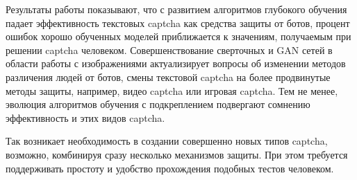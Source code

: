 Результаты работы показывают, что с развитием алгоритмов глубокого обучения падает эффективность текстовых captcha как средства защиты от ботов, процент ошибок хорошо обученных моделей приближается к значениям, получаемым при решении captcha человеком. Совершенствование сверточных и GAN сетей в области работы с изображениями актуализирует вопросы об изменении методов различения людей от ботов, смены текстовой captcha на более продвинутые методы защиты, например, видео captcha\cite{video-captcha} или игровая captcha\cite{prev-research-4}. Тем не менее, эволюция алгоритмов обучения с подкреплением подвергают сомнению эффективность и этих видов captcha.

Так возникает необходимость в создании совершенно новых типов captcha, возможно, комбинируя сразу несколько механизмов защиты. При этом требуется поддерживать простоту и удобство прохождения подобных тестов человеком.